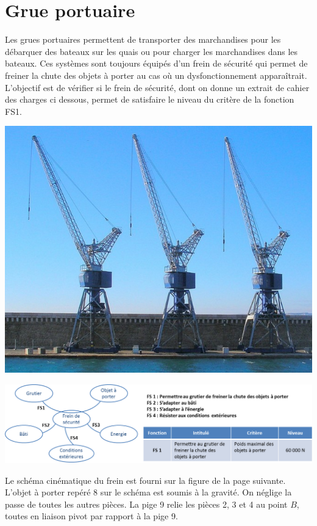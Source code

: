 \documentclass[10pt]{article}
\begin{document}
\section*{Grue portuaire}
\setcounter{subparagraph}{0}
\begin{minipage}[c]{.6\linewidth}
Les grues portuaires permettent de transporter des marchandises pour les débarquer des bateaux sur les quais ou pour charger les marchandises dans les bateaux. Ces systèmes sont toujours équipés d'un frein de sécurité qui permet de freiner la chute des objets à porter au cas où un dysfonctionnement apparaîtrait. L'objectif est de vérifier si le frein de sécurité, dont on donne un extrait de cahier des charges ci dessous, permet de satisfaire le niveau du critère de la fonction FS1. 
\end{minipage}\hfill
\begin{minipage}[c]{.35\linewidth}
\begin{center}
\includegraphics[width=.95\textwidth]{images/grue}
\end{center}
\end{minipage}
\begin{center}
\includegraphics[width=.8\textwidth]{images/fonctions}
\end{center}

Le schéma cinématique du frein est fourni sur la figure de la page suivante. L'objet à porter repéré 8 sur le schéma est soumis à la gravité. On néglige la passe de toutes les autres pièces. La pige 9 relie les pièces 2, 3 et 4 au point $B$, toutes en liaison pivot par rapport à la pige 9. 
\end{document}

